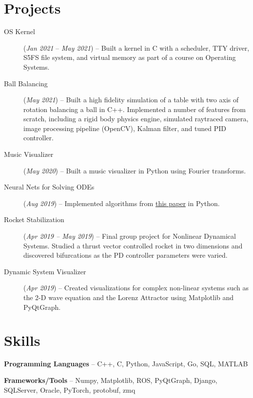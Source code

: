 \documentclass[letterpaper,11pt]{article}
\makeatletter
\newcommand{\resumeItem}[2]{
  \item\small{
    \textbf{#1}{#2 \vspace{-5pt}}
  }
}
\newcommand{\resumeSubheadingSimple}[2]{
  \vspace{-1pt}\item
    \begin{tabular*}{0.97\textwidth}{l@{\extracolsep{\fill}}r}
      \textbf{#1} & \textit{\small#2}\\
    \end{tabular*}\vspace{-3pt}
}
\newcommand{\resumeSubHeadingListStart}{}
\newcommand{\resumeSubHeadingListEnd}{}
\newcommand{\resumeItemListStart}{\begin{itemize}}
\newcommand{\resumeItemListEnd}{\end{itemize}}
\makeatother
\begin{document}
\section{Projects}
\vspace{3pt}
\small{
\begin{description}
  \item[OS Kernel] (\textit{Jan 2021} -- \textit{May 2021}) -- Built a kernel in C with a scheduler, TTY driver, S5FS file system, and virtual memory as part of a course on Operating Systems.
  \item[Ball Balancing] (\textit{May 2021}) -- Built a high fidelity simulation of a table with two axis of rotation balancing a ball in C++. Implemented a number of features from scratch, including a rigid body physics engine, simulated raytraced camera, image processing pipeline (OpenCV), Kalman filter, and tuned PID controller.
  \item[Music Visualizer] (\textit{May 2020}) -- Built a music visualizer in Python using Fourier transforms.
  \item[Neural Nets for Solving ODEs] (\textit{Aug 2019}) -- Implemented algorithms from \href{https://arxiv.org/abs/physics/9705023}{this paper} in Python.
  \item[Rocket Stabilization] (\textit{Apr 2019 -- May 2019}) -- Final group project for Nonlinear Dynamical Systems. Studied a thrust vector controlled rocket in two dimensions and discovered bifurcations as the PD controller parameters were varied.

  \item[Dynamic System Visualizer] (\textit{Apr 2019}) -- Created visualizations for complex non-linear systems such as the 2-D wave equation and the Lorenz Attractor using Matplotlib and PyQtGraph.
\end{description}
}
\section{Skills}
  \resumeSubHeadingListStart
    \item \textbf{Programming Languages} -- C++, C, Python, JavaScript, Go, SQL, MATLAB
    \item \textbf{Frameworks/Tools} -- Numpy, Matplotlib, ROS, PyQtGraph, Django, SQLServer, Oracle, PyTorch, protobuf, zmq
  \resumeSubHeadingListEnd
\end{document}
